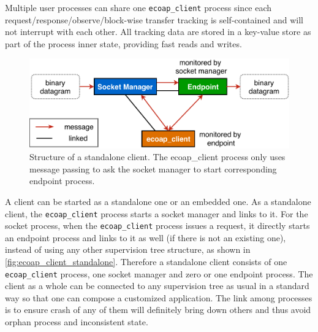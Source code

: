 Multiple user processes can share one \verb|ecoap_client| process since each request/response/observe/block-wise transfer tracking is self-contained and will not interrupt with each other. All tracking data are stored in a key-value store as part of the process inner state, providing fast reads and writes. 

\begin{figure}[!htbp]
\centering
\includegraphics[scale = 0.7]{ecoap_client_standalone}
\caption[Structure of a standalone client]{Structure of a standalone client. The ecoap\_client process only uses message passing to ask the socket manager to start corresponding endpoint process.}
\label{fig:ecoap_client_standalone}
\end{figure}

A client can be started as a standalone one or an embedded one. As a standalone client, the \verb|ecoap_client| process starts a socket manager and links to it. For the socket process, when the \verb|ecoap_client| process issues a request, it directly starts an endpoint process and links to it as well (if there is not an existing one), instead of using any other supervision tree structure, as shown in \autoref{fig:ecoap_client_standalone}. Therefore a standalone client consists of one \verb|ecoap_client| process, one socket manager and zero or one endpoint process. The client as a whole can be connected to any supervision tree as usual in a standard way so that one can compose a customized application. The link among processes is to ensure crash of any of them will definitely bring down others and thus avoid orphan process and inconsistent state. 

